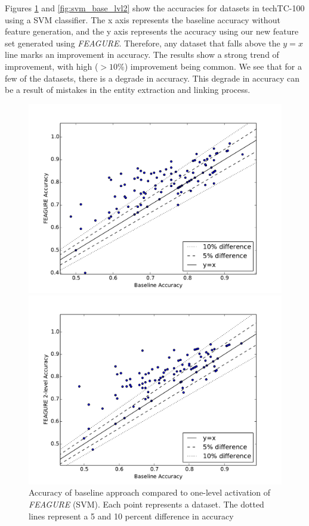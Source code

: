\documentclass[twoside,11pt]{article}
\theoremstyle{definition}
\begin{document}
Figures \ref{fig:svm_base_lvl1} and \ref{fig:svm_base_lvl2} show the accuracies for datasets in techTC-100 using a SVM classifier. The x axis represents the baseline accuracy without feature generation, and the y axis represents the accuracy using our new feature set generated using \emph{FEAGURE}. Therefore, any dataset that falls above the $y=x$ line marks an improvement in accuracy. 
The results show a strong trend of improvement, with high ($>10\%$) improvement being common.
We see that for a few of the datasets, there is a degrade in accuracy. This degrade in accuracy can be a result of mistakes in the entity extraction and linking process.

\begin{figure}
	\centering
	\begin{minipage}{0.45\textwidth}
		\centering
		\includegraphics[width=1.2\textwidth]{svm_full} %
		\caption{Accuracy of
			baseline approach compared to one-level activation of \emph{FEAGURE} (SVM). Each point represents a dataset. The dotted lines represent a 5 and 10 percent difference in accuracy}
		\label{fig:svm_base_lvl1}
	\end{minipage}\hfill
	\begin{minipage}{0.45\textwidth}
		\centering
		\includegraphics[width=1.2\textwidth]{svm_full_lvl2} %

\end{minipage}
\end{figure}
\end{document}
